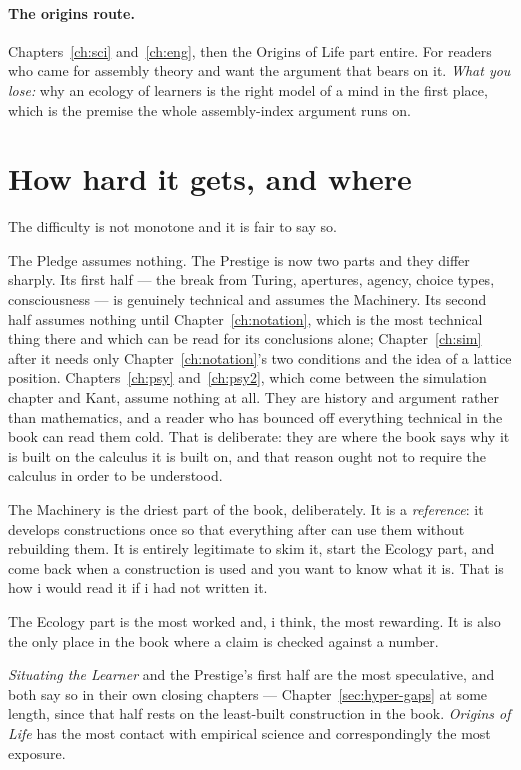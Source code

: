 \paragraph{The origins route.}
Chapters~\ref{ch:sci} and~\ref{ch:eng}, then the Origins of Life
part entire.
For readers who came for assembly theory and want the argument that
bears on it.
\emph{What you lose:} why an ecology of learners is the right model
of a mind in the first place, which is the premise the whole
assembly-index argument runs on.

\section*{How hard it gets, and where}

The difficulty is not monotone and it is fair to say so.

The Pledge assumes nothing.
The Prestige is now two parts and they differ sharply.
Its first half --- the break from Turing, apertures, agency, choice
types, consciousness --- is genuinely technical and assumes the
Machinery.
Its second half assumes nothing until Chapter~\ref{ch:notation}, which
is the most technical thing there and which can be read for its
conclusions alone; Chapter~\ref{ch:sim} after it needs only
Chapter~\ref{ch:notation}'s two conditions and the idea of a lattice
position.
Chapters~\ref{ch:psy} and~\ref{ch:psy2}, which come between the
simulation chapter and Kant, assume nothing at all.
They are history and argument rather than mathematics, and a reader
who has bounced off everything technical in the book can read them
cold.
That is deliberate: they are where the book says why it is built on
the calculus it is built on, and that reason ought not to require the
calculus in order to be understood.

The Machinery is the driest part of the book, deliberately.
It is a \emph{reference}: it develops constructions once so that
everything after can use them without rebuilding them.
It is entirely legitimate to skim it, start the Ecology part, and
come back when a construction is used and you want to know what it
is.
That is how i would read it if i had not written it.

The Ecology part is the most worked and, i think, the most
rewarding.
It is also the only place in the book where a claim is checked
against a number.

\emph{Situating the Learner} and the Prestige's first half are the most
speculative, and both say so in their own closing chapters ---
Chapter~\ref{sec:hyper-gaps} at some length, since that half rests on
the least-built construction in the book.
\emph{Origins of Life} has the most contact with empirical
science and correspondingly the most exposure.

